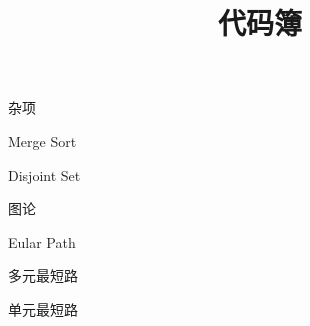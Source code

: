 \documentclass{article}
\title{代码簿}
\begin{document}
\maketitle

\begin{enumerate}

{\bf \LARGE \item  杂项}

	\begin{itemize}

	{\bf \item  Merge Sort}
	
	

	{\bf \item  Disjoint Set}

	

	\end{itemize}

{\bf \LARGE \item  图论}


	\begin{itemize}
	
	{\bf \item  Eular Path}	
	
	
	{\bf \item  多元最短路}
		
	
	{\bf \item  单元最短路}
		
	\end{itemize}




\end{enumerate}
\end{document}
